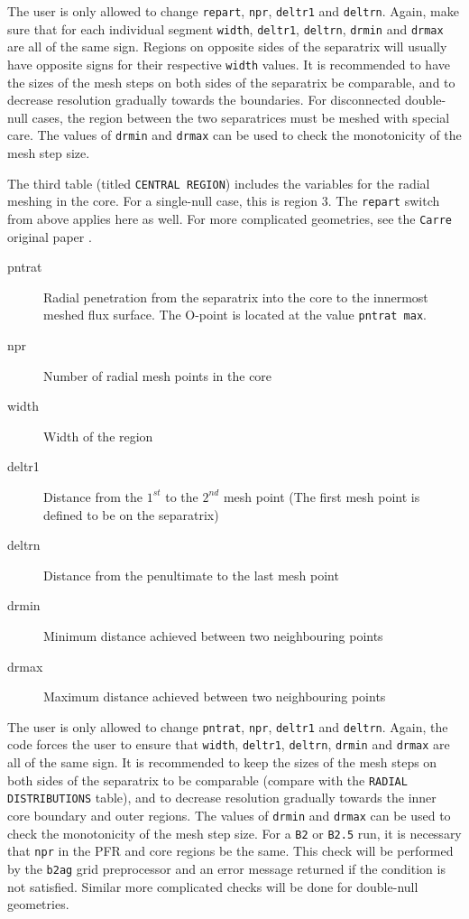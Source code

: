 \documentclass[a4paper,10pt]{report}
\begin{document}
The user is only allowed to change {\tt repart}, {\tt npr}, {\tt deltr1} and {\tt deltrn}. Again, make sure that for each individual segment {\tt width}, {\tt deltr1}, {\tt deltrn}, {\tt drmin} and {\tt drmax} are all of the same sign. Regions on opposite sides of the separatrix will usually have opposite signs for their respective {\tt width} values. It is recommended to have the sizes of the mesh steps on both sides of the separatrix be comparable, and to decrease resolution gradually towards the boundaries. For disconnected double-null cases, the region between the two separatrices must be meshed with special care. The values of {\tt drmin} and {\tt drmax} can be used to check the monotonicity of the mesh step size.

The third table
(titled {\tt CENTRAL REGION}) includes the variables for the radial
meshing in the core. For a single-null case, this is region 3.
The {\tt repart} switch from above applies here as well.
For more complicated geometries, see the {\tt Carre} original paper \cite{Marchand1996}.

\begin{description}
  \item[pntrat] Radial penetration from the separatrix into the core to the innermost meshed flux surface. The O-point is located at the value {\tt pntrat max}.
  \item[npr] Number of radial mesh points in the core
  \item[width] Width of the region
  \item[deltr1] Distance from the $1^{st}$ to the $2^{nd}$ mesh point (The first mesh point is defined to be on the separatrix)
  \item[deltrn] Distance from the penultimate to the last mesh point
  \item[drmin] Minimum distance achieved between two neighbouring points
  \item[drmax] Maximum distance achieved between two neighbouring points
\end{description}

The user is only allowed to change {\tt pntrat}, {\tt npr}, {\tt deltr1} and {\tt deltrn}. Again, the code forces the user to ensure that {\tt width}, {\tt deltr1}, {\tt deltrn}, {\tt drmin} and {\tt drmax} are all of the same sign. It is recommended to keep the sizes of the mesh steps on both sides of the separatrix to be comparable (compare with the {\tt RADIAL DISTRIBUTIONS} table), and to decrease resolution gradually towards the inner core boundary and outer regions. The values of {\tt drmin} and {\tt drmax} can be used to check the monotonicity of the mesh step size. For a {\tt B2} or {\tt B2.5} run, it is necessary that {\tt npr} in the PFR and core regions be the same. This check will be performed by the {\tt b2ag} grid preprocessor and an error message returned if the condition is not satisfied. Similar more complicated checks will be done for double-null geometries.
\end{document}
